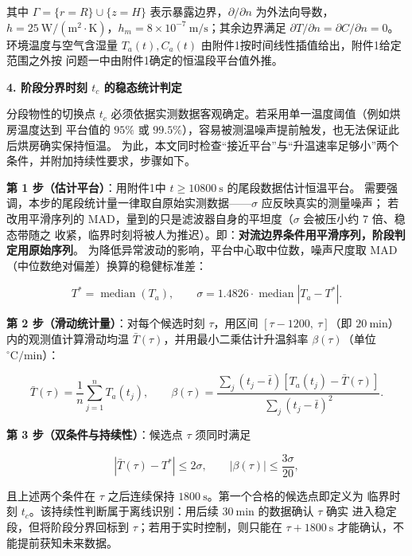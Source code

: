 \documentclass[12pt,a4paper]{ctexart}
\begin{document}
其中 $\Gamma=\{r=R\}\cup\{z=H\}$ 表示暴露边界，$\partial/\partial n$ 为外法向导数，
$h=25\ \mathrm{W/(m^2\cdot K)}$，$h_m=8\times10^{-7}\ \mathrm{m/s}$；其余边界满足 $\partial T/\partial n=\partial C/\partial n=0$。
环境温度与空气含湿量 $T_a(t),C_a(t)$ 由附件1按时间线性插值给出，附件1给定范围之外按
问题一中由附件1确定的恒温段平台值外推。

\textbf{4. 阶段分界时刻 $t_c$ 的稳态统计判定}

分段物性的切换点 $t_c$ 必须依据实测数据客观确定。若采用单一温度阈值（例如烘房温度达到
平台值的 $95\%$ 或 $99.5\%$），容易被测温噪声提前触发，也无法保证此后烘房确实保持恒温。
为此，本文同时检查“接近平台”与“升温速率足够小”两个条件，并附加持续性要求，步骤如下。

\textbf{第 1 步（估计平台）}：用附件1中 $t\ge 10800\ \mathrm{s}$ 的尾段数据估计恒温平台。
需要强调，本步的尾段统计量一律取自原始实测数据——$\sigma$ 应反映真实的测量噪声；
若改用平滑序列的 MAD，量到的只是滤波器自身的平坦度（$\sigma$ 会被压小约 $7$ 倍、稳态带随之
收紧，临界时刻将被人为推迟）。即：\textbf{对流边界条件用平滑序列，阶段判定用原始序列}。
为降低异常波动的影响，平台中心取中位数，噪声尺度取 MAD（中位数绝对偏差）换算的稳健标准差：

\begin{equation}
T^{*}=\operatorname{median}(T_a),\qquad
\sigma=1.4826\cdot\operatorname{median}\left|T_a-T^{*}\right|.
\label{eq:p2mad}
\end{equation}

\textbf{第 2 步（滑动统计量）}：对每个候选时刻 $\tau$，用区间 $[\tau-1200,\ \tau]$（即
$20\ \mathrm{min}$）内的观测值计算滑动均温 $\bar T(\tau)$，并用最小二乘估计升温斜率
$\beta(\tau)$（单位 $^\circ\mathrm{C/min}$）：

\begin{equation}
\bar T(\tau)=\frac{1}{n}\sum_{j=1}^{n}T_a(t_j),\qquad
\beta(\tau)=\frac{\sum_{j}\left(t_j-\bar t\right)\left[T_a(t_j)-\bar T(\tau)\right]}
{\sum_{j}\left(t_j-\bar t\right)^{2}}.
\label{eq:p2slope}
\end{equation}

\textbf{第 3 步（双条件与持续性）}：候选点 $\tau$ 须同时满足

\begin{equation}
\left|\bar T(\tau)-T^{*}\right|\le 2\sigma,
\qquad
\left|\beta(\tau)\right|\le \frac{3\sigma}{20},
\label{eq:p2crit}
\end{equation}

且上述两个条件在 $\tau$ 之后连续保持 $1800\ \mathrm{s}$。第一个合格的候选点即定义为
临界时刻 $t_c$。该持续性判断属于离线识别：用后续 $30\ \mathrm{min}$ 的数据确认 $\tau$ 确实
进入稳定段，但将阶段分界回标到 $\tau$；若用于实时控制，则只能在
$\tau+1800\ \mathrm{s}$ 才能确认，不能提前获知未来数据。
\end{document}
